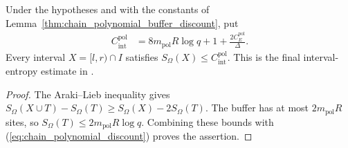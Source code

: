 \begin{lemma}
    \label{thm:chain_polynomial_interval_entropy}
    \leanok
    Under the hypotheses and with the constants of
    Lemma~\ref{thm:chain_polynomial_buffer_discount}, put
    \begin{align}
        C_{\mathrm{int}}^{\mathrm{pol}}
         & =8m_{\mathrm{pol}}R\log q+1+
        \frac{2C_E^{\mathrm{pol}}}{\Delta}.
        \label{eq:chain_polynomial_interval_entropy}
    \end{align}
    Every interval $X=[l,r)\cap I$ satisfies
    $S_\Omega(X)\le C_{\mathrm{int}}^{\mathrm{pol}}$.
    This is the final interval-entropy estimate in
    \cite[Part~I]{TNLean2026OneDimensional}.
\end{lemma}
\begin{proof}
    \leanok
    The Araki--Lieb inequality gives
    $S_\Omega(X\cup T)-S_\Omega(T)\ge S_\Omega(X)-2S_\Omega(T)$.
    The buffer has at most $2m_{\mathrm{pol}}R$ sites, so
    $S_\Omega(T)\le2m_{\mathrm{pol}}R\log q$.
    Combining these bounds with
    (\ref{eq:chain_polynomial_discount}) proves the assertion.
\end{proof}

